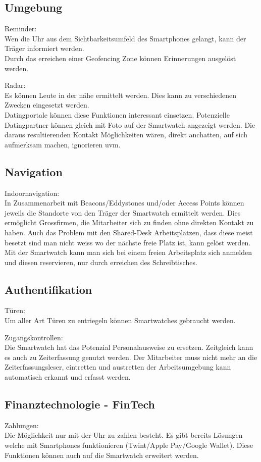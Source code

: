 \subsection{Umgebung}
Reminder:\\
Wen die Uhr aus dem Sichtbarkeitsumfeld des Smartphones gelangt, kann der Träger informiert werden.\\
Durch das erreichen einer Geofencing Zone können Erinnerungen ausgelöst werden.

Radar:\\
Es können Leute in der nähe ermittelt werden. Dies kann zu verschiedenen Zwecken eingesetzt werden.\\
Datingportale können diese Funktionen interessant einsetzen. Potenzielle Datingpartner können gleich mit Foto auf der Smartwatch angezeigt werden.
Die daraus resultierenden Kontakt Möglichkeiten wären, direkt anchatten, auf sich aufmerksam machen, ignorieren uvm.

\subsection{Navigation}
Indoornavigation:\\
In Zusammenarbeit mit Beacons/Eddystones und/oder Access Points können jeweils die Standorte von den Träger der Smartwatch ermittelt werden.
Dies ermöglicht Grossfirmen, die Mitarbeiter sich zu finden ohne direkten Kontakt zu haben.
Auch das Problem mit den Shared-Desk Arbeitsplätzen, dass diese meist besetzt sind man nicht weiss wo der nächste freie Platz ist, kann gelöst werden.
Mit der Smartwatch kann man sich bei einem freien Arbeitsplatz sich anmelden und diesen reservieren, nur durch erreichen des Schreibtisches.

\subsection{Authentifikation}
Türen:\\
Um aller Art Türen zu entriegeln können Smartwatches gebraucht werden.

Zugangskontrollen:\\
Die Smartwatch hat das Potenzial Personalausweise zu ersetzen. Zeitgleich kann es auch zu Zeiterfassung genutzt werden.
Der Mitarbeiter muss nicht mehr an die Zeiterfassungsleser, eintretten und austretten der Arbeitsumgebung kann automatisch erkannt und erfasst werden.

\subsection{Finanztechnologie - FinTech}
Zahlungen:\\
Die Möglichkeit nur mit der Uhr zu zahlen besteht. Es gibt bereits Lösungen welche mit Smartphones funktionieren {(Twint/Apple Pay/Google Wallet)}.
Diese Funktionen können auch auf die Smartwatch erweitert werden.

